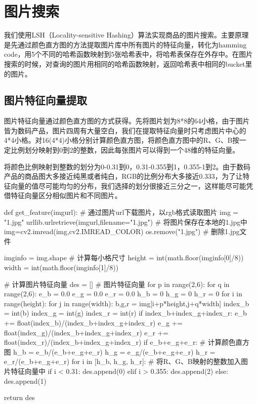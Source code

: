\section{图片搜索}

我们使用LSH（Locality-sensitive Hashing）算法实现商品的图片搜索。主要原理是先通过颜色直方图的方法提取图片库中所有图片的特征向量，转化为hamming code，用5个不同的哈希函数映射到5张哈希表中，将哈希表保存在外存中。在图片搜索的时候，对查询的图片用相同的哈希函数映射，返回哈希表中相同的bucket里的图片。

\subsection{图片特征向量提取}

图片特征向量通过颜色直方图的方式获得。先将图片划为8*8的64小格，由于图片皆为数码产品，图片四周有大量空白，我们在提取特征向量时只考虑图片中心的4*4小格。对16(4*4)小格分别计算颜色直方图，将颜色直方图中的R、G、B按一定比例划分映射到0到2的整数，因此每张图片可以得到一个48维的特征向量。

将颜色比例映射到整数的划分为0-0.31到0，0.31-0.355到1，0.355-1到2。由于数码产品的商品图大多接近纯黑或者纯白，RGB的比例分布大多接近0.333，为了让特征向量的值尽可能均匀的分布，我们选择的划分很接近三分之一，这样能尽可能凭借特征向量区分相似图片和不同图片。

\begin{python}
def get_feature(imgurl):
    # 通过图片url下载图片，以rgb格式读取图片
    img = "1.jpg"
    urllib.urlretrieve(imgurl,filename="1.jpg") # 将图片保存在本地的1.jpg中
    img=cv2.imread(img,cv2.IMREAD_COLOR)
    os.remove("1.jpg") # 删除1.jpg文件

    imginfo = img.shape # 计算每小格尺寸
    height = int(math.floor(imginfo[0]/8))
    width = int(math.floor(imginfo[1]/8))

    # 计算图片特征向量
    des = [] # 图片特征向量
    for p in range(2,6):
        for q in range(2,6):
            e_b = 0.0
            e_g = 0.0
            e_r = 0.0
            h_b = 0
            h_g = 0
            h_r = 0
            for i in range(height):
                for j in range(width):
                    b,g,r = img[i+p*height,j+q*width]
                    index_b = int(b)
                    index_g = int(g)
                    index_r = int(r)
                    if index_b+index_g+index_r:
                        e_b += float(index_b)/(index_b+index_g+index_r)
                        e_g += float(index_g)/(index_b+index_g+index_r)
                        e_r += float(index_r)/(index_b+index_g+index_r)
            if e_b+e_g+e_r: # 计算颜色直方图
                h_b = e_b/(e_b+e_g+e_r)
                h_g = e_g/(e_b+e_g+e_r)
                h_r = e_r/(e_b+e_g+e_r)
            for i in [h_b, h_g, h_r]: # 将R、G、B映射的整数加入图片特征向量中
                if i < 0.31:
                    des.append(0)
                elif i > 0.355:
                    des.append(2)
                else:
                    des.append(1)

    return des
\end{python}

